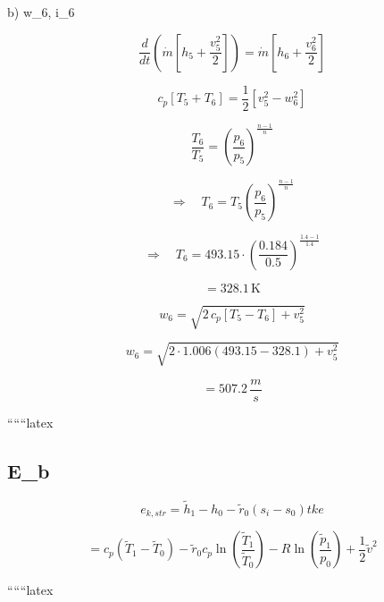 b) \quad w_6, \; i_6

\[
\frac{d}{dt} \left( \dot{m} \left[ h_5 + \frac{v_5^2}{2} \right] \right) = \dot{m} \left[ h_6 + \frac{v_6^2}{2} \right]
\]

\[
c_p \left[ T_5 + T_6 \right] = \frac{1}{2} \left[ v_5^2 - w_6^2 \right]
\]

\[
\frac{T_6}{T_5} = \left( \frac{p_6}{p_5} \right)^{\frac{n-1}{n}}
\]

\[
\Rightarrow \quad T_6 = T_5 \left( \frac{p_6}{p_5} \right)^{\frac{n-1}{n}}
\]

\[
\Rightarrow \quad T_6 = 493.15 \cdot \left( \frac{0.184}{0.5} \right)^{\frac{1.4-1}{1.4}}
\]

\[
= 328.1 \, \text{K}
\]

\[
w_6 = \sqrt{2 \, c_p \left[ T_5 - T_6 \right] + v_5^2}
\]

\[
w_6 = \sqrt{2 \cdot 1.006 \left( 493.15 - 328.1 \right) + v_5^2}
\]

\[
= 507.2 \, \frac{m}{s}
\]

``````latex

\subsection*{E_b}

\begin{equation*}
e_{k, str} = \tilde{h}_1 - h_0 - \tilde{r}_0 (s_i - s_0) tke
\end{equation*}

\begin{equation*}
= c_p (\tilde{T}_1 - \tilde{T}_0) - \tilde{r}_0 c_p \ln \left( \frac{\tilde{T}_1}{\tilde{T}_0} \right) - R \ln \left( \frac{\tilde{p}_1}{p_0} \right) + \frac{1}{2} \tilde{v}^2
\end{equation*}

``````latex